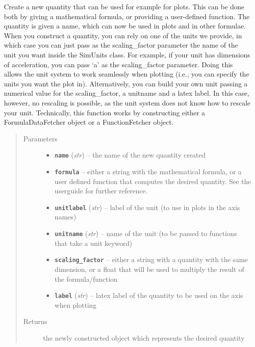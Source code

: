\documentclass[letterpaper,10pt,english]{sphinxmanual}
\begin{document}
\begin{fulllineitems}
\label{index:facade.CreateUserQuantity}
Create a new quantity that can be used for example for plots. This can be done both by
giving a mathematical formula, or providing a user-defined function.
The quantity is given a name, which can now be used in plots and in other
formulae.  When you construct a quantity, you can rely on one of the units we
provide, in which case you can just pass as the scaling\_factor parameter the
name of the unit you want inside the SimUnits class. For example, if your unit
has dimensions of acceleration, you can pass `a' as the scaling\_factor
parameter. Doing this allows the unit system to work seamlessly when plotting
(i.e., you can specify the units you want the plot in).  Alternatively, you can
build your own unit passing a numerical value for the scaling\_factor,
a unitname and a latex label.  In this case, however, no rescaling is possible,
as the unit system does not know how to rescale your unit.
Technically, this function works by constructing either a FormulaDataFetcher object
or a FunctionFetcher object.
\begin{quote}\begin{description}
\item[{Parameters}] \leavevmode\begin{itemize}
\item {} 
\textbf{\texttt{name}} (\emph{str}) -- the name of the new quantity created

\item {} 
\textbf{\texttt{formula}} -- either a string with the mathematical formula, or a user defined function
that computes the desired quantity. See the userguide for further reference.

\item {} 
\textbf{\texttt{unitlabel}} (\emph{str}) -- label of the unit (to use in plots in the axis names)

\item {} 
\textbf{\texttt{unitname}} (\emph{str}) -- name of the unit (to be passed to functions that take a unit keyword)

\item {} 
\textbf{\texttt{scaling\_factor}} -- either a string with a quantity with the same dimension, or a float
that will be used to multiply the result of the formula/function

\item {} 
\textbf{\texttt{label}} (\emph{str}) -- latex label of the quantity to be used on the axis when plotting

\end{itemize}

\item[{Returns}] \leavevmode
the newly constructed object which represents the desired quantity

\end{description}\end{quote}

\end{fulllineitems}
\end{document}
